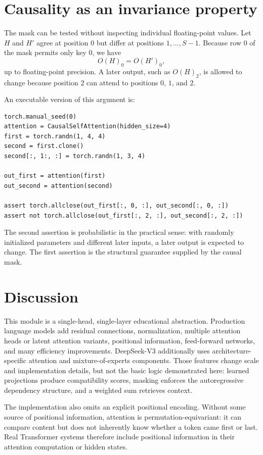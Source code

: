 \documentclass[11pt]{article}
\begin{document}
\section{Causality as an invariance property}
The mask can be tested without inspecting individual floating-point values.
Let $H$ and $H'$ agree at position $0$ but differ at positions $1,\ldots,S-1$.
Because row $0$ of the mask permits only key $0$, we have
\[
O(H)_{0}=O(H')_{0},
\]
up to floating-point precision. A later output, such as $O(H)_2$, is allowed
to change because position $2$ can attend to positions $0$, $1$, and $2$.

An executable version of this argument is:

\begin{lstlisting}
torch.manual_seed(0)
attention = CausalSelfAttention(hidden_size=4)
first = torch.randn(1, 4, 4)
second = first.clone()
second[:, 1:, :] = torch.randn(1, 3, 4)

out_first = attention(first)
out_second = attention(second)

assert torch.allclose(out_first[:, 0, :], out_second[:, 0, :])
assert not torch.allclose(out_first[:, 2, :], out_second[:, 2, :])
\end{lstlisting}

The second assertion is probabilistic in the practical sense: with randomly
initialized parameters and different later inputs, a later output is expected
to change. The first assertion is the structural guarantee supplied by the
causal mask.

\section{Discussion}
This module is a single-head, single-layer educational abstraction. Production
language models add residual connections, normalization, multiple attention
heads or latent attention variants, positional information, feed-forward
networks, and many efficiency improvements. DeepSeek-V3 additionally uses
architecture-specific attention and mixture-of-experts components. Those
features change scale and implementation details, but not the basic logic
demonstrated here: learned projections produce compatibility scores, masking
enforces the autoregressive dependency structure, and a weighted sum retrieves
context.

The implementation also omits an explicit positional encoding. Without some
source of positional information, attention is permutation-equivariant: it can
compare content but does not inherently know whether a token came first or
last. Real Transformer systems therefore include positional information in
their attention computation or hidden states.
\end{document}
